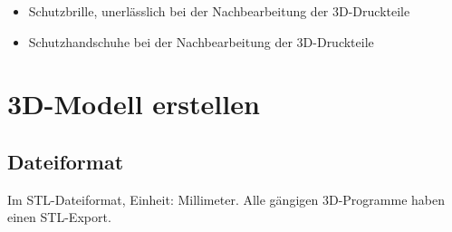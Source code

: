 \documentclass{\basedir/fablab-document}
\begin{document}
\begin{itemize}
	\item Schutzbrille, unerlässlich bei der Nachbearbeitung der 3D-Druckteile \\
	\item Schutzhandschuhe bei der Nachbearbeitung der 3D-Druckteile\\
\end{itemize}
	\newpage

	
	\renewcommand{\contentsname}{Inhaltsverzeichnis / Arbeitsablauf}
	\setcounter{tocdepth}{2}
	\tableofcontents
	\newpage
	
	\section{3D-Modell erstellen}
	\subsection{Dateiformat}
	
	Im STL-Dateiformat, Einheit: Millimeter. Alle gängigen 3D-Programme haben einen STL-Export.
	
\end{document}
